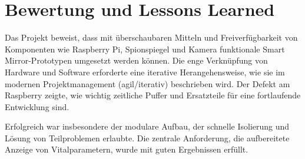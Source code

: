 \chapter{Bewertung und Lessons Learned}

Das Projekt beweist, dass mit überschaubaren Mitteln und Freiverfügbarkeit von Komponenten wie Raspberry Pi, Spionspiegel und Kamera funktionale Smart Mirror-Prototypen umgesetzt werden können. Die enge Verknüpfung von Hardware und Software erforderte eine iterative Herangehensweise, wie sie im modernen Projektmanagement (agil/iterativ) beschrieben wird. Der Defekt am Raspberry zeigte, wie wichtig zeitliche Puffer und Ersatzteile für eine fortlaufende Entwicklung sind.

Erfolgreich war insbesondere der modulare Aufbau, der schnelle Isolierung und Lösung von Teilproblemen erlaubte. Die zentrale Anforderung, die aufbereitete Anzeige von Vitalparametern, wurde mit guten Ergebnissen erfüllt.